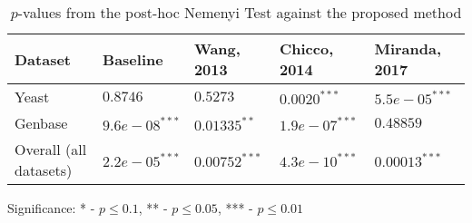 \begin{table}[t]
    \footnotesize
    \centering
    \caption{$p$-values from the post-hoc Nemenyi Test against the proposed method}
    \label{results:nemenyi}
    \begin{threeparttable}
    \begin{tabular}{@{}lllll@{}}
    \toprule
    Dataset                & Baseline    & Wang, 2013     & Chicco, 2014      &
    Miranda, 2017\\ \midrule
    Yeast                  & $0.8746 $ & $0.5273 $ & $0.0020^{***}$ & ${5.5e-05}^{***}$ \\
    Genbase                & ${9.6e-08}^{***}$ & $0.01335^{**}$ & ${1.9e-07}^{***}$ & $0.48859$ \\ \cmidrule{1-5}
    Overall (all datasets) & ${2.2e-05}^{***}$ & $0.00752^{***}$ & ${4.3e-10}^{***}$ & $0.00013^{***}$ \\ \bottomrule
    \end{tabular}
    \begin{tablenotes}
        \item Significance: * - $p \leq 0.1$, ** - $p \leq 0.05$, *** - $p \leq 0.01$
    \end{tablenotes}
    \end{threeparttable}
    \end{table}
